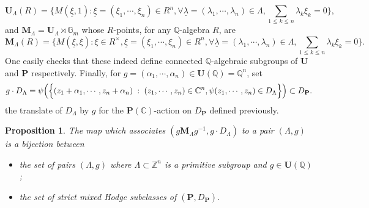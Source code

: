 \documentclass[10pt]{article}
\numberwithin{equation}{subsection}
\theoremstyle{plain}
\newtheorem{proposition}[theorem]{Proposition}
\theoremstyle{definition}
\theoremstyle{remark}
\newcommand{\Z}{\mathbb Z}
\newcommand{\Q}{\mathbb Q}
\newcommand{\C}{\mathbb C}
\newcommand{\mult}{\mathbb G}
\newcommand{\pp}{\mathbf P}
\newcommand{\uu}{\mathbf U}
\newcommand{\M}{\mathbf M}
\newcommand{\xxi}{\underline{\xi}}
\newcommand{\lambdaa}{\underline{\lambda}}
\begin{document}
\[
\uu_{\Lambda}(R) = \Big\{ M(\xxi, 1) :  \xxi = (\xi_1, \cdots, \xi_n) \in R^n, \forall \lambdaa = (\lambda_1, \cdots, \lambda_n) \in \Lambda,  \sum_{1 \leqslant k \leqslant n} \lambda_k \xi_k  = 0 \Big\},
\]
and $\M_{\Lambda} = \uu_{\Lambda} \rtimes \mult_m$ whose $R$-points, for any $\Q$-algebra $R$, are
{\small \[
\M_{\Lambda}(R) = \Big\{ M(\xxi, \xi) :  \xi \in R^\times, \xxi = (\xi_1, \cdots, \xi_n) \in R^n, \forall \lambdaa = (\lambda_1, \cdots, \lambda_n) \in \Lambda,  \sum_{1 \leqslant k \leqslant n} \lambda_k \xi_k  = 0 \Big\}.
\]}
One easily checks that these indeed define connected $\Q$-algebraic subgroups of $\uu$ and $\pp$ respectively. Finally, for $g = (\alpha_1, \cdots, \alpha_n) \in \uu(\Q) = \Q^n$, set
\[
g \cdot D_{\Lambda} = \psi\Big(\Big\{ (z_1 + \alpha_1, \cdots, z_n + \alpha_n) \hspace{0.1cm} : \hspace{0.1cm} (z_1, \cdots, z_n) \in \C^n, \psi(z_1, \cdots, z_n) \in D_{\Lambda} \Big\}\Big) \subset D_\pp.
\]
the translate of $D_{\Lambda}$ by $g$ for the $\pp(\C)$-action on $D_\pp$ defined previously.
\begin{proposition}\label{classc}
The map which associates $(g \M_{\Lambda} g^{-1}, g \cdot D_{\Lambda})$ to a pair $(\Lambda, g)$ is a bijection between
\begin{itemize}
\item the set of pairs $(\Lambda, g)$ where $\Lambda \subset \Z^n$ is a primitive subgroup and $g \in \uu(\Q)$;
\item the set of strict mixed Hodge subclasses of $(\pp, D_\pp)$.
\end{itemize}
\end{proposition}
\end{document}
